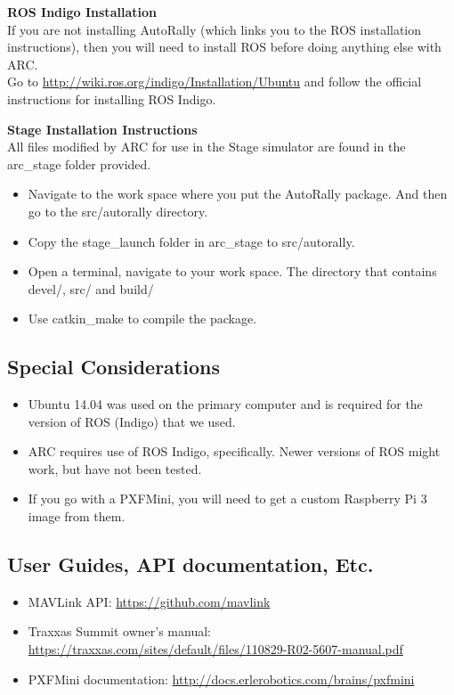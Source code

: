 \documentclass[compsoc,draftclsnofoot,onecolumn,10pt]{IEEEtran}
\begin{document}
    \textbf{ROS Indigo Installation}\\
    If you are not installing AutoRally (which links you to the ROS installation instructions), then you will need to install ROS before doing anything else with ARC.\\
    Go to \href{http://wiki.ros.org/indigo/Installation/Ubuntu}{http://wiki.ros.org/indigo/Installation/Ubuntu} and follow the official instructions for installing ROS Indigo.

    \textbf{Stage Installation Instructions}\\
    All files modified by ARC for use in the Stage simulator are found in the arc\_stage folder provided.

    \begin{itemize}
    	\item Navigate to the work space where you put the AutoRally package. And then go to the src/autorally directory.
    	\item Copy the stage\_launch folder in arc\_stage to src/autorally.
    	\item Open a terminal, navigate to your work space. The directory that contains devel/, src/ and build/
    	\item Use catkin\_make to compile the package.
    \end{itemize}

    \subsection{Special Considerations}
    \begin{itemize}
        \item Ubuntu 14.04 was used on the primary computer and is required for the version of ROS (Indigo) that we used.
        \item ARC requires use of ROS Indigo, specifically. Newer versions of ROS might work, but have not been tested.
        \item If you go with a PXFMini, you will need to get a custom Raspberry Pi 3 image from them.
    \end{itemize}

    \subsection{User Guides, API documentation, Etc.}
    \begin{itemize}
        \item MAVLink API: \href{https://github.com/mavlink}{https://github.com/mavlink}
        \item Traxxas Summit owner's manual: \href{https://traxxas.com/sites/default/files/110829-R02-5607-manual.pdf}{https://traxxas.com/sites/default/files/110829-R02-5607-manual.pdf}
        \item PXFMini documentation: \href{http://docs.erlerobotics.com/brains/pxfmini}{http://docs.erlerobotics.com/brains/pxfmini}
    \end{itemize}
\end{document}
